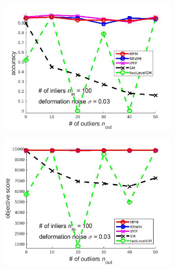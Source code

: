 \documentclass[
	fontsize=12pt,
	paper=a4,
	twoside=false,
	numbers=noenddot,
	plainheadsepline,
	toc=listof,
	toc=bibliography
]{scrartcl}
\begin{document}
\begin{figure}[h] 
	\begin{subfigure}[b]{0.3\textwidth}
		\centering
		\includegraphics[scale=0.25]{"fig_ver2108/syntheticPointSets/outliertest_n50/accuracy_greedy"} 
	\end{subfigure}%
	\begin{subfigure}[b]{0.3\textwidth}
		\centering
		\includegraphics[scale=0.25]{"fig_ver2108/syntheticPointSets/outliertest_n50/score_greedy"} 
	\end{subfigure} 
	\begin{subfigure}[b]{0.3\textwidth}
		\centering

\end{subfigure}
\end{figure}
\end{document}
